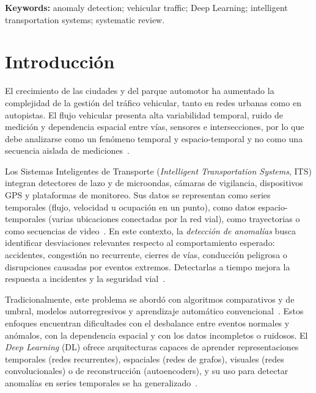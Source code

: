 \documentclass[12pt, a4paper]{article}
\begin{document}
\noindent\textbf{Keywords:} anomaly detection; vehicular traffic; Deep Learning; intelligent transportation systems; systematic review.

\section{Introducci\'{o}n}
\label{sec:intro}

El crecimiento de las ciudades y del parque automotor ha aumentado la complejidad de la gesti\'{o}n del tr\'{a}fico vehicular, tanto en redes urbanas como en autopistas. El flujo vehicular presenta alta variabilidad temporal, ruido de medici\'{o}n y dependencia espacial entre v\'{i}as, sensores e intersecciones, por lo que debe analizarse como un fen\'{o}meno temporal y espacio-temporal y no como una secuencia aislada de mediciones~\cite{djenouri2019survey,zhang2020urban}.

Los Sistemas Inteligentes de Transporte (\textit{Intelligent Transportation Systems}, ITS) integran detectores de lazo y de microondas, c\'{a}maras de vigilancia, dispositivos GPS y plataformas de monitoreo. Sus datos se representan como series temporales (flujo, velocidad u ocupaci\'{o}n en un punto), como datos espacio-temporales (varias ubicaciones conectadas por la red vial), como trayectorias o como secuencias de video~\cite{djenouri2019survey,santhosh2020anomaly}. En este contexto, la \textit{detecci\'{o}n de anomal\'{i}as} busca identificar desviaciones relevantes respecto al comportamiento esperado: accidentes, congesti\'{o}n no recurrente, cierres de v\'{i}as, conducci\'{o}n peligrosa o disrupciones causadas por eventos extremos. Detectarlas a tiempo mejora la respuesta a incidentes y la seguridad vial~\cite{elsahly2022systematic,razi2023deep}.

Tradicionalmente, este problema se abord\'{o} con algoritmos comparativos y de umbral, modelos autorregresivos y aprendizaje autom\'{a}tico convencional~\cite{elsahly2022systematic,olugbade2022review}. Estos enfoques encuentran dificultades con el desbalance entre eventos normales y an\'{o}malos, con la dependencia espacial y con los datos incompletos o ruidosos. El \textit{Deep Learning} (DL) ofrece arquitecturas capaces de aprender representaciones temporales (redes recurrentes), espaciales (redes de grafos), visuales (redes convolucionales) o de reconstrucci\'{o}n (autoencoders), y su uso para detectar anomal\'{i}as en series temporales se ha generalizado~\cite{darban2024deep}.
\end{document}
